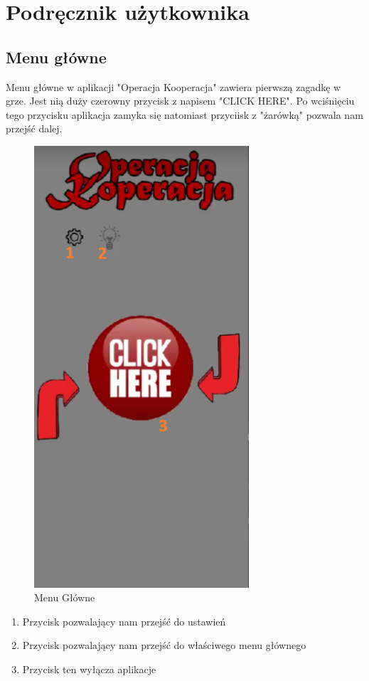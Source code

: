 \newpage
\section{Podręcznik użytkownika}  %
\subsection{Menu główne}
Menu główne w aplikacji "Operacja Kooperacja" zawiera pierwszą zagadkę w grze. Jest nią duży czerowny przycisk z napisem "CLICK HERE". Po wciśnięciu tego przycisku aplikacja zamyka się natomiast przyciisk z "żarówką" pozwala nam przejść dalej.
	\begin{figure}[!htb]
	\begin{center}
		\includegraphics[width=8cm]{rys/opis1.png}
		\caption{Menu Główne}
		\label{rys:rysunek001}
	\end{center}
\end{figure}

\begin{enumerate}
	\item Przycisk pozwalający nam przejść do ustawień 
	\item Przycisk pozwalający nam przejść do właściwego menu głównego
	\item Przycisk ten wyłącza aplikacje 
\end{enumerate}

